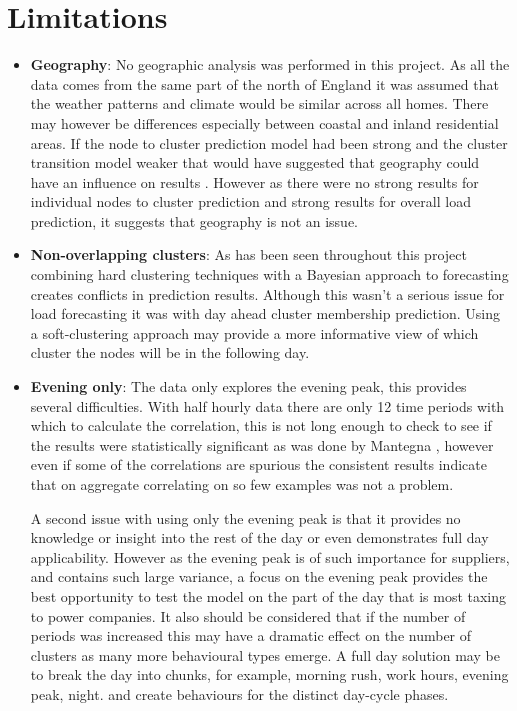 \section{Limitations}
\begin{itemize}
    \item \textbf{Geography}: No geographic analysis was performed in this project. As all the data comes from the same part of the north of England it was assumed that the weather patterns and climate would be similar across all homes. There may however be differences especially between coastal and inland residential areas. If the node to cluster prediction model had been strong and the cluster transition model weaker that would have suggested that geography could have an influence on results . However as there were no strong results for individual nodes to cluster prediction and strong results for overall load prediction, it suggests that geography is not an issue.

    \item \textbf{Non-overlapping clusters}: As has been seen throughout this project combining hard clustering techniques with a Bayesian approach to forecasting creates conflicts in prediction results. Although this wasn't a serious issue for load forecasting it was with day ahead cluster membership prediction. Using a soft-clustering approach may provide a more informative view of which cluster the nodes will be in the following day.

    \item \textbf{Evening only}: The data only explores the evening peak, this provides several difficulties. With half hourly data there are only 12 time periods with which to calculate the correlation, this is not long enough to check to see if the results were statistically significant as was done by  Mantegna \cite{mantegna1999}, however even if some of the correlations are spurious the consistent results indicate that on aggregate correlating on so few examples was not a problem. 
    
    A second issue with using only the evening peak is that it provides no knowledge or insight into the rest of the day or even demonstrates full day applicability. However as the evening peak is of such importance for suppliers, and contains such large variance, a focus on the evening peak provides the best opportunity to test the model on the part of the day that is most taxing to power companies. It also should be considered that if the number of periods was increased this may have a dramatic effect on the number of clusters as many more behavioural types emerge. A full day solution may be to break the day into chunks, for example, morning rush, work hours, evening peak, night. and create behaviours for the distinct day-cycle phases.


\end{itemize}
